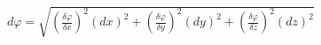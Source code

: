 \documentclass{standalone}
\begin{document}
    $d\varphi = \sqrt{(\frac{\delta\varphi}{\delta x})^2(dx)^2 + (\frac{\delta\varphi}{\delta y})^2(dy)^2 + (\frac{\delta\varphi}{\delta z})^2(dz)^2}$
\end{document}
